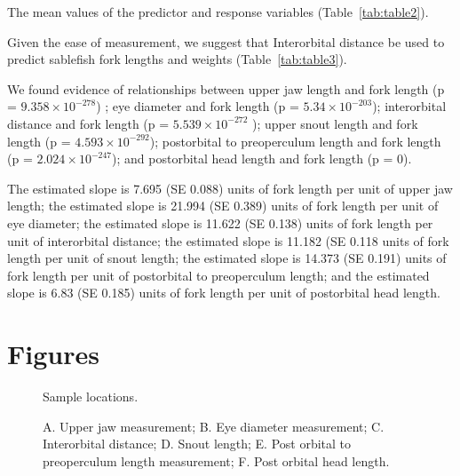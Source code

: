 \documentclass[12pt]{article}\usepackage[]{graphicx}\usepackage[]{color}
\begin{document}
The mean values of the predictor and response variables (Table~\ref{tab:table2}).

Given the ease of measurement, we suggest that Interorbital distance be used to predict sablefish fork lengths and weights (Table~\ref{tab:table3}).

We found evidence of relationships between upper jaw length and fork length (p = \ensuremath{9.358\times 10^{-278}}) ; eye diameter and fork length (p = \ensuremath{5.34\times 10^{-203}}); interorbital distance and fork length (p = \ensuremath{5.539\times 10^{-272}} ); upper snout length and fork length (p = \ensuremath{4.593\times 10^{-292}}); postorbital to preoperculum length and fork length (p = \ensuremath{2.024\times 10^{-247}}); and postorbital head length and fork length (p = 0).

The estimated slope is 7.695 (SE 0.088) units of fork length per unit of upper jaw length; the estimated slope is 21.994 (SE 0.389) units of fork length per unit of eye diameter; the estimated slope is 11.622 (SE 0.138) units of fork length per unit of interorbital distance; the estimated slope is 11.182 (SE 0.118 units of fork length per unit of snout length; the estimated slope is 14.373 (SE 0.191) units of fork length per unit of postorbital to preoperculum length; and the estimated slope is 6.83 (SE 0.185) units of fork length per unit of postorbital head length.

\hypertarget{figures}{%
\section{Figures}\label{figures}}


\begin{figure}[htb]

{\centering {} 

}

\caption{Sample locations.}\label{fig:figure1}
\end{figure}

\begin{figure}[htb]

{\centering {} 

}

\caption{A. Upper jaw measurement; B. Eye diameter measurement; C. Interorbital distance; D. Snout length; E. Post orbital to preoperculum length measurement; F. Post orbital head length.}\label{fig:figure2}
\end{figure}
\end{document}

